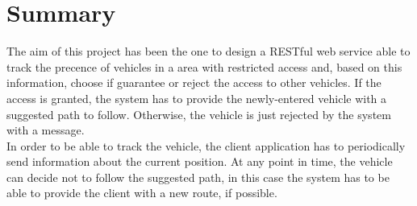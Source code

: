 \chapter{Summary}\label{Chap:Summary}
The aim of this project has been the one to design a RESTful web service able to track the precence of vehicles in a area with restricted access and, based on this information, choose if guarantee or reject the access to other vehicles. If the access is granted, the system has to provide the newly-entered vehicle with a suggested path to follow. Otherwise, the vehicle is just rejected by the system with a message.\\
In order to be able to track the vehicle, the client application has to periodically send information about the current position. At any point in time, the vehicle can decide not to follow the suggested path, in this case the system has to be able to provide the client with a new route, if possible.\\
